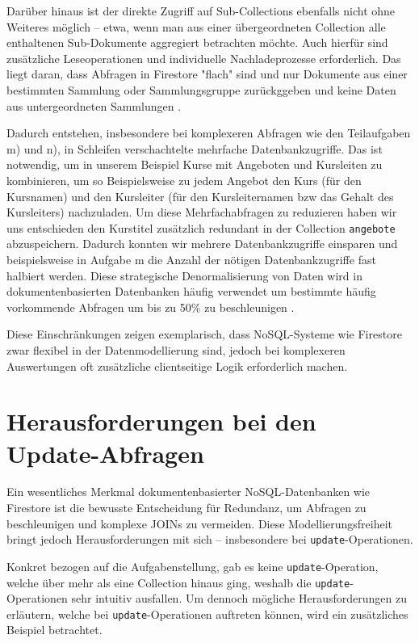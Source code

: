 \documentclass[12pt,a4paper%
              ,oneside     %
              ,titlepage
              ,DIV=13
              ,headinclude
              ,footinclude=false%
              ,cleardoublepage=empty%
              ,parskip=half,
              BCOR=0mm,
              ]{scrreprt}
\begin{document}
Darüber hinaus ist der direkte Zugriff auf Sub-Collections ebenfalls nicht ohne Weiteres möglich – etwa, wenn man aus einer übergeordneten Collection alle enthaltenen Sub-Dokumente aggregiert betrachten möchte. Auch hierfür sind zusätzliche Leseoperationen und individuelle Nachladeprozesse erforderlich. Das liegt daran, dass Abfragen in Firestore "flach" sind und nur Dokumente aus einer bestimmten Sammlung oder Sammlungsgruppe zurückggeben und keine Daten aus untergeordneten Sammlungen \cite{FirebaseComparison.2025}.

Dadurch entstehen, insbesondere bei komplexeren Abfragen wie den Teilaufgaben m) und n), in Schleifen verschachtelte mehrfache Datenbankzugriffe. Das ist notwendig, um in unserem Beispiel Kurse mit Angeboten und Kursleiten zu kombinieren, um so Beispielsweise zu jedem Angebot den Kurs (für den Kursnamen) und den Kursleiter (für den Kursleiternamen bzw das Gehalt des Kursleiters) nachzuladen. Um diese Mehrfachabfragen zu reduzieren haben wir uns entschieden den Kurstitel zusätzlich redundant in der Collection \texttt{angebote} abzuspeichern. Dadurch konnten wir mehrere Datenbankzugriffe einsparen und beispielsweise in Aufgabe m die Anzahl der nötigen Datenbankzugriffe fast halbiert werden. Diese strategische Denormalisierung von Daten wird in dokumentenbasierten Datenbanken häufig verwendet um bestimmte häufig vorkommende Abfragen um bis zu 50\% zu beschleunigen \cite{MoldStud.2025}. 

Diese Einschränkungen zeigen exemplarisch, dass NoSQL-Systeme wie Firestore zwar flexibel in der Datenmodellierung sind, jedoch bei komplexeren Auswertungen oft zusätzliche clientseitige Logik erforderlich machen.

\chapter{Herausforderungen bei den Update-Abfragen}
\label{update-label}

Ein wesentliches Merkmal dokumentenbasierter NoSQL-Datenbanken wie Firestore ist die bewusste Entscheidung für Redundanz, um Abfragen zu beschleunigen und komplexe JOINs zu vermeiden. Diese Modellierungsfreiheit bringt jedoch Herausforderungen mit sich – insbesondere bei \texttt{update}-Operationen.

Konkret bezogen auf die Aufgabenstellung, gab es keine \texttt{update}-Operation, welche über mehr als eine Collection hinaus ging, weshalb die \texttt{update}-Operationen sehr intuitiv ausfallen. Um dennoch mögliche Herausforderungen zu erläutern, welche bei \texttt{update}-Operationen auftreten können, wird ein zusätzliches Beispiel betrachtet.
\end{document}
